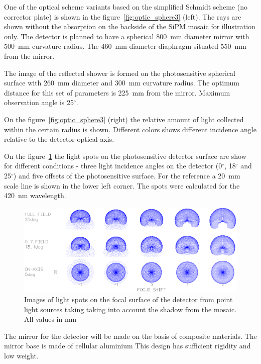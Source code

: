 \documentclass[a4paper,11pt]{article}
\begin{document}
One of the optical scheme variants based on the simplified Schmidt scheme (no corrector plate) is shown in the figure~\ref{fig:optic_sphere3} (left). The rays are shown without the absorption on the backside of the SiPM mosaic for illustration only. The detector is planned to have a spherical 800~mm diameter mirror with 500~mm curvature radius. The 460~mm diameter diaphragm situated 550~mm from the mirror.

The image of the reflected shower is formed on the photosensitive spherical surface with 260~mm diameter and 300~mm curvature radius. The optimum distance for this set of parameters is 225~mm from the mirror. Maximum observation angle is 25$^\circ$.

On the figure~\ref{fig:optic_sphere3} (right) the relative amount of light collected within the certain radius is shown. Different colors shows different incidence angle relative to the detector optical axis.

On the figure~\ref{fig:spots} the light spots on the photosensitive detector surface are show for different conditions - three light incidence angles on the detector (0$^\circ$, 18$^\circ$ and 25$^\circ$) and five offsets of the photosensitive surface. For the reference a 20~mm scale line is shown in the lower left corner. The spots were calculated for the 420~nm wavelength.

\begin{figure}[bt]
\centering
\includegraphics[width=.8\textwidth]{Sphere3spot.png}
\caption{ Images of light spots on the focal surface of the detector from point light sources taking taking into account the shadow from the mosaic. All values in mm}
\label{fig:spots}
\end{figure}    

The mirror for the detector will be made on the basis of composite materials. The mirror base is made of cellular aluminium This design has sufficient rigidity and low weight.
\end{document}

